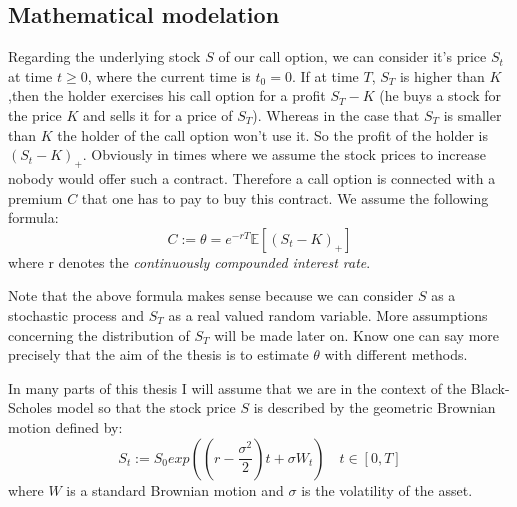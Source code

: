 \documentclass[12pt,a4paper]{scrartcl}
\begin{document}
\subsection{Mathematical modelation}
Regarding the underlying stock $S$ of our call option, we can consider it's price $S_t$ at time $t \geq 0$, where the current time is $t_0 = 0$.
If at time $T$, $S_T$ is higher than $K$,then the holder exercises his call option for a profit $S_T - K$ (he buys a stock for the price $K$ and sells it for a price of $S_T$). Whereas in the case that $S_T$ is smaller than $K$ the holder of the call option won't use it. So the profit of the holder is $(S_t-K)_+$. 
Obviously in times where we assume the stock prices to increase nobody would offer such a contract. Therefore a call option is connected with a premium $C$ that one has to pay to buy this contract. We assume the following formula:
\[
C := \theta = e^{-rT} \mathbb{E}\left[ (S_t-K)_+ \right]
\]
where r denotes the \emph{continuously compounded interest rate}. 

Note that the above formula makes sense because we can consider $S$ as a stochastic process and $S_T$ as a real valued random variable. More assumptions concerning the distribution of $S_T$ will be made later on. Know one can say more precisely that the aim of the thesis is to estimate $\theta$ with different methods.

In many parts of this thesis I will assume that we are in the context of the Black-Scholes model so that the stock price $S$ is described by the geometric Brownian motion defined by:
\begin{equation}
\label{eq:black}
S_t := S_0 exp \left( \left( r - \frac{\sigma^2}{2} \right) t + \sigma W_t \right) \quad t \in [0,T]
\end{equation}
where $W$ is a standard Brownian motion and  $\sigma$ is the volatility of the asset.
\end{document}
